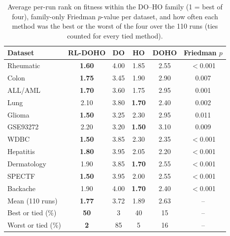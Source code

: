 \documentclass[pdflatex,sn-basic]{sn-jnl}
\begin{document}
\begin{table}[t]
\centering
\caption{Average per-run rank on fitness within the DO--HO family (1 = best of four), family-only Friedman $p$-value per dataset, and how often each method was the best or the worst of the four over the 110 runs (ties counted for every tied method).}
\label{tab:family}
\footnotesize
\setlength{\tabcolsep}{3.5pt}
\begin{tabular}{@{}lccccc@{}}
\toprule
Dataset & RL-DOHO & DO & HO & DOHO & Friedman $p$ \\
\midrule
Rheumatic & \textbf{1.60} & 4.00 & 1.85 & 2.55 & $<$0.001 \\
\midrule
Colon & \textbf{1.75} & 3.45 & 1.90 & 2.90 & 0.007 \\
ALL/AML & \textbf{1.70} & 3.60 & 1.75 & 2.95 & 0.001 \\
Lung & 2.10 & 3.80 & \textbf{1.70} & 2.40 & 0.002 \\
Glioma & \textbf{1.50} & 3.25 & 2.30 & 2.95 & 0.011 \\
GSE93272 & 2.20 & 3.20 & \textbf{1.50} & 3.10 & 0.009 \\
\midrule
WDBC & \textbf{1.50} & 3.85 & 2.30 & 2.35 & $<$0.001 \\
Hepatitis & \textbf{1.80} & 3.95 & 2.05 & 2.20 & $<$0.001 \\
Dermatology & 1.90 & 3.85 & \textbf{1.70} & 2.55 & $<$0.001 \\
SPECTF & \textbf{1.50} & 3.95 & 2.00 & 2.55 & $<$0.001 \\
Backache & 1.90 & 4.00 & \textbf{1.70} & 2.40 & $<$0.001 \\
\midrule
Mean (110 runs) & \textbf{1.77} & 3.72 & 1.89 & 2.63 & -- \\
Best or tied (\%) & \textbf{50} & 3 & 40 & 15 & -- \\
Worst or tied (\%) & \textbf{2} & 85 & 5 & 16 & -- \\
\bottomrule
\end{tabular}
\end{table}
\end{document}
